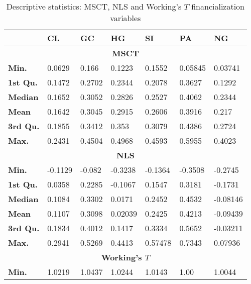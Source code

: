 \begin{landscape}
\begin{table}[]
\begin{center}
\caption{Descriptive statistics: MSCT, NLS and Working's $T$ financialization variables}
\label{tab:stat5}
\begin{tabular}{@{}lllllll@{}}
\toprule
                 & \textbf{CL} & \textbf{GC} & \textbf{HG} & \textbf{SI} & \textbf{PA} & \textbf{NG} \\ \midrule
\multicolumn{7}{c}{\textbf{MSCT}}                                                                    \\ \midrule
\textbf{Min.}    & 0.0629    & 0.166    & 0.1223    & 0.1552    & 0.05845    & 0.03741    \\
\textbf{1st Qu.} & 0.1472    & 0.2702    & 0.2344    & 0.2078    & 0.3627    & 0.1292    \\
\textbf{Median}  & 0.1652    & 0.3052    & 0.2826    & 0.2527    & 0.4062    & 0.2344    \\
\textbf{Mean}    & 0.1642    & 0.3045    & 0.2915    & 0.2606    & 0.3916    & 0.217    \\
\textbf{3rd Qu.} & 0.1855    & 0.3412    & 0.353    & 0.3079    & 0.4386    & 0.2724    \\
\textbf{Max.}    & 0.2431    & 0.4504    & 0.4968    & 0.4593    & 0.5955    & 0.4023    \\ \midrule
\multicolumn{7}{c}{\textbf{NLS}}                                                                     \\ \midrule
\textbf{Min.}    & -0.1129   & -0.082   & -0.3238   & -0.1364   & -0.3508   & -0.2745   \\
\textbf{1st Qu.} & 0.0358    & 0.2285    & -0.1067   & 0.1547    & 0.3181    & -0.1731   \\
\textbf{Median}  & 0.1084    & 0.3302    & 0.0171    & 0.2452    & 0.4532    & -0.08146   \\
\textbf{Mean}    & 0.1107    & 0.3098    & 0.02039    & 0.2425    & 0.4213    & -0.09439   \\
\textbf{3rd Qu.} & 0.1834    & 0.4012    & 0.1417    & 0.3334    & 0.5652    & -0.03211   \\
\textbf{Max.}    & 0.2941    & 0.5269    & 0.4413    & 0.57478    & 0.7343    & 0.07936    \\ \midrule
\multicolumn{7}{c}{\textbf{Working's $T$}}                                                               \\ \midrule
\textbf{Min.}    & 1.0219    & 1.0437    & 1.0244    & 1.0143    & 1.00    & 1.0044    \\

\end{tabular}
\end{center}
\end{table}
\end{landscape}
